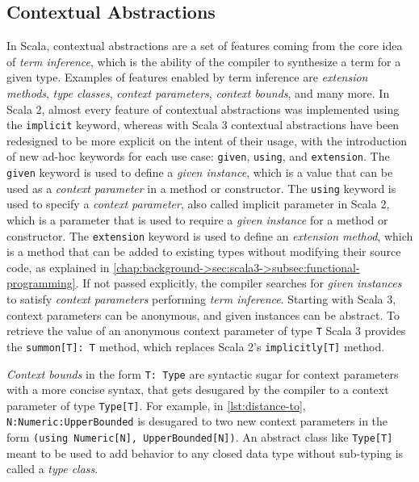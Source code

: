 \subsection{Contextual Abstractions} \label{chap:background->sec:scala3->subsec:contextual-abstractions}

In Scala, contextual abstractions are a set of features coming from the core idea of \textit{term inference}, which is the ability of the compiler to synthesize a  term for a given type.
%
Examples of features enabled by term inference are \textit{extension methods}, \textit{type classes}, \textit{context parameters}, \textit{context bounds}, and many more.
%
In Scala 2, almost every feature of contextual abstractions was implemented using the \texttt{implicit} keyword, whereas with Scala 3 contextual abstractions have been redesigned to be more explicit on the intent of their usage, with the introduction of new ad-hoc keywords for each use case: \texttt{given}, \texttt{using}, and \texttt{extension}.
%
The \texttt{given} keyword is used to define a \textit{given instance}, which is a value that can be used as a \textit{context parameter} in a method or constructor.
%
The \texttt{using} keyword is used to specify a \textit{context parameter}, also called implicit parameter in Scala 2, which is a parameter that is used to require a \textit{given instance} for a method or constructor.
%
The \texttt{extension} keyword is used to define an \textit{extension method}, which is a method that can be added to existing types without modifying their source code, as explained in \cref{chap:background->sec:scala3->subsec:functional-programming}.
%
If not passed explicitly, the compiler searches for \textit{given instances} to satisfy \textit{context parameters} performing \textit{term inference}.
%
Starting with Scala 3, context parameters can be anonymous, and given instances can be abstract.
%
To retrieve the value of an anonymous context parameter of type \texttt{T} Scala 3 provides the \texttt{summon[T]: T} method, which replaces Scala 2's \texttt{implicitly[T]} method.

\textit{Context bounds} in the form \texttt{T: Type} are syntactic sugar for context parameters with a more concise syntax, that gets desugared by the compiler to a context parameter of type \texttt{Type[T]}.
%
For example, in \cref{lst:distance-to}, \texttt{N:Numeric:UpperBounded} is desugared to two new context parameters in the form \texttt{(using Numeric[N], UpperBounded[N])}.
%
An abstract class like \texttt{Type[T]} meant to be used to add behavior to any closed data type without sub-typing is called a \textit{type class}.

